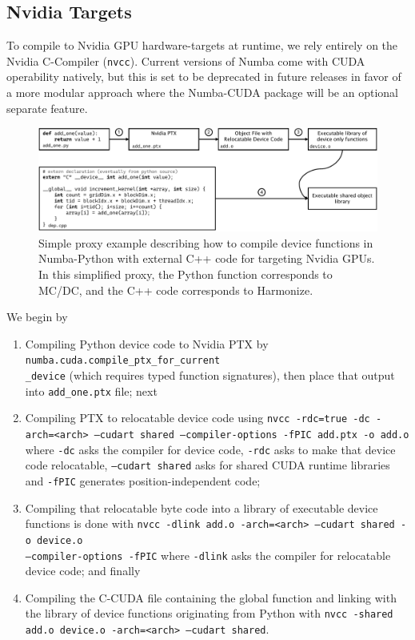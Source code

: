 \subsection{Nvidia Targets}

To compile to Nvidia GPU hardware-targets at runtime, we rely entirely on the Nvidia C-Compiler (\texttt{nvcc}).
Current versions of Numba come with CUDA operability natively, but this is set to be deprecated in future releases in favor of a more modular approach where the Numba-CUDA package will be an optional separate feature.

\begin{figure}[]
  \centering
  \includegraphics[width=\textwidth]{appendix/mcdc_prof_figs/flownvcc.pdf}
  \caption{Simple proxy example describing how to compile device functions in Numba-Python with external C++ code for targeting Nvidia GPUs. In this simplified proxy, the Python function corresponds to MC/DC, and the C++ code corresponds to Harmonize.}
  \label{fig:codenvcc}
\end{figure}

We begin by
\begin{enumerate}
    \item Compiling Python device code to Nvidia PTX by \texttt{numba.cuda.compile\_ptx\_for\_current\\\_device} (which requires typed function signatures), then place that output into \texttt{add\_one.ptx} file; next
    
    \item Compiling PTX to relocatable device code using \texttt{nvcc -rdc=true -dc -arch=<arch> --cudart shared --compiler-options -fPIC add.ptx -o add.o} where \texttt{-dc} asks the compiler for device code, \texttt{-rdc} asks to make that device code relocatable, \texttt{--cudart shared} asks for shared CUDA runtime libraries and \texttt{-fPIC} generates position-independent code;
    
    \item Compiling that relocatable byte code into a library of executable device functions is done with \texttt{nvcc -dlink add.o -arch=<arch> --cudart shared -o device.o \\--compiler-options -fPIC} where \texttt{-dlink} asks the compiler for relocatable device code; and finally
    
    \item Compiling the C-CUDA file containing the global function and linking with the library of device functions originating from Python with \texttt{nvcc -shared add.o device.o -arch=<arch> --cudart shared}.
    
\end{enumerate}


